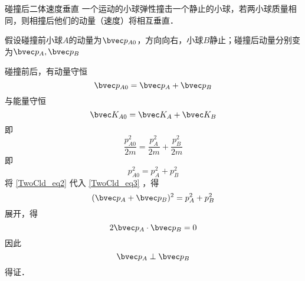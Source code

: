 \begin{example}{碰撞后二体速度垂直}
一个运动的小球弹性撞击一个静止的小球，若两小球质量相同，则相撞后他们的动量（速度）将相互垂直．

假设碰撞前小球$A$的动量为$\bvec p_{A0}$，方向向右，小球$B$静止；碰撞后动量分别变为$\bvec p_{A},\bvec p_{B}$

碰撞前后，有动量守恒
\begin{equation}\label{TwoCld_eq2}
\bvec p_{A0} = \bvec p_{A} + \bvec p_{B}
\end{equation}
与能量守恒
\begin{equation}
\bvec K_{A0} = \bvec K_{A} + \bvec K_{B}
\end{equation}
即
\begin{equation}
\frac{p_{A0}^2}{2m}=\frac{p_{A}^2}{2m}+\frac{p_{B}^2}{2m}
\end{equation}
即
\begin{equation}\label{TwoCld_eq3}
p_{A0}^2 = p_{A}^2+p_{B}^2
\end{equation}
将 \autoref{TwoCld_eq2} 代入 \autoref{TwoCld_eq3} ，得
\begin{equation}
(\bvec p_{A} + \bvec p_{B})^2=p_{A}^2+p_{B}^2
\end{equation}
展开，得
\begin{equation}
2\bvec p_{A} \cdot \bvec p_{B}=0
\end{equation}
因此
\begin{equation}
\bvec p_{A} \perp \bvec p_{B}
\end{equation}
得证．
\end{example}



